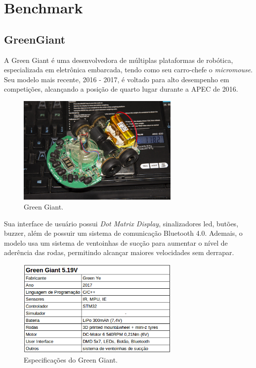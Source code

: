\section{Benchmark}
\label{sec:benchmark}

\subsection{GreenGiant}
\hspace{0.5cm} A Green Giant é uma desenvolvedora de múltiplas plataformas de robótica, especializada em eletrônica embarcada, tendo como seu carro-chefe o \textit{micromouse}. Seu modelo mais recente, 2016 - 2017, é voltado para alto desempenho em competições, alcançando a posição de quarto lugar durante a APEC de 2016.

\begin{figure}[H]
	\centering
	\includegraphics[width=0.7\textwidth]
	{Figures/GreenGiant_model.jpg}
	\caption{\label{fig:Green_Giant_model} Green Giant. }
	\end{figure}

\hspace{0.5cm}Sua interface de usuário possui \textit{Dot Matrix Display}, sinalizadores led, butões, buzzer, além de possuir um sistema de comunicação Bluetooth 4.0. Ademais, o modelo usa um sistema de ventoinhas de sucção para aumentar o nível de aderência das rodas, permitindo alcançar maiores velocidades sem derrapar.


\begin{figure}[H]
	\centering
	\includegraphics[width=0.7\textwidth]
	{Figures/GreenGiant.png}
	\caption{\label{fig:Green_Giant} Especificações do Green Giant. }
\end{figure}


